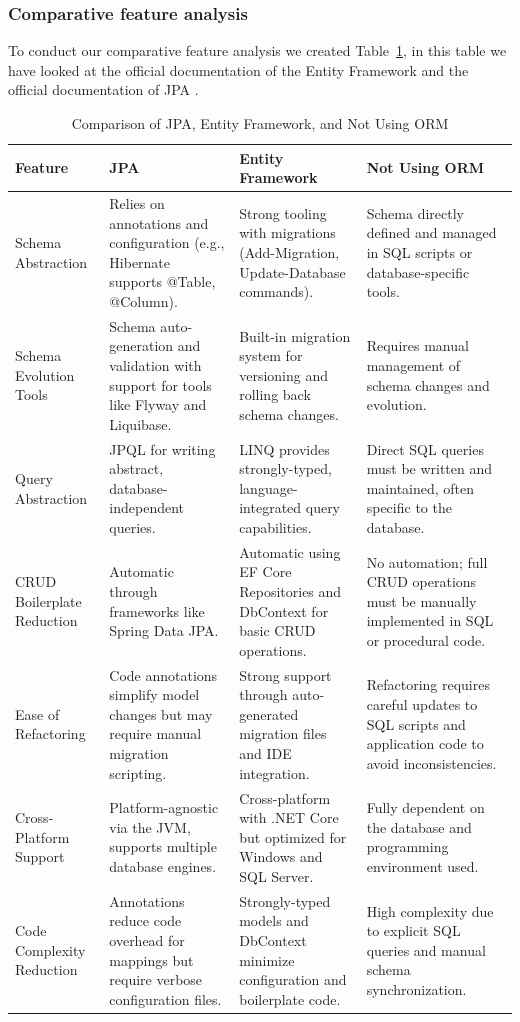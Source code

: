 \subsubsection{Comparative feature analysis}
To conduct our comparative feature analysis we created Table~\ref{tab:jpa_vs_ef_vs_no_orm}, in this table we have looked at the official documentation of the Entity Framework \cite{rick-anderson_getting_2023} and the official documentation of JPA \cite{noauthor_jpa_nodate}.
\begin{table}[H]
    \centering
    \begin{tabularx}{\textwidth}{|l|X|X|X|} %
        \hline
        \textbf{Feature} & \textbf{JPA} & \textbf{Entity Framework} & \textbf{Not Using ORM} \\ \hline
        Schema Abstraction & Relies on annotations and configuration (e.g., Hibernate supports @Table, @Column). & Strong tooling with migrations (Add-Migration, Update-Database commands). & Schema directly defined and managed in SQL scripts or database-specific tools. \\ \hline
        Schema Evolution Tools & Schema auto-generation and validation with support for tools like Flyway and Liquibase. & Built-in migration system for versioning and rolling back schema changes. & Requires manual management of schema changes and evolution. \\ \hline
        Query Abstraction & JPQL for writing abstract, database-independent queries. & LINQ provides strongly-typed, language-integrated query capabilities. & Direct SQL queries must be written and maintained, often specific to the database. \\ \hline
        CRUD Boilerplate Reduction & Automatic through frameworks like Spring Data JPA. & Automatic using EF Core Repositories and DbContext for basic CRUD operations. & No automation; full CRUD operations must be manually implemented in SQL or procedural code. \\ \hline
        Ease of Refactoring & Code annotations simplify model changes but may require manual migration scripting. & Strong support through auto-generated migration files and IDE integration. & Refactoring requires careful updates to SQL scripts and application code to avoid inconsistencies. \\ \hline
        Cross-Platform Support & Platform-agnostic via the JVM, supports multiple database engines. & Cross-platform with .NET Core but optimized for Windows and SQL Server. & Fully dependent on the database and programming environment used. \\ \hline
        Code Complexity Reduction & Annotations reduce code overhead for mappings but require verbose configuration files. & Strongly-typed models and DbContext minimize configuration and boilerplate code. & High complexity due to explicit SQL queries and manual schema synchronization. \\ \hline
    \end{tabularx}
    \caption{Comparison of JPA, Entity Framework, and Not Using ORM}
    \label{tab:jpa_vs_ef_vs_no_orm}
\end{table}


